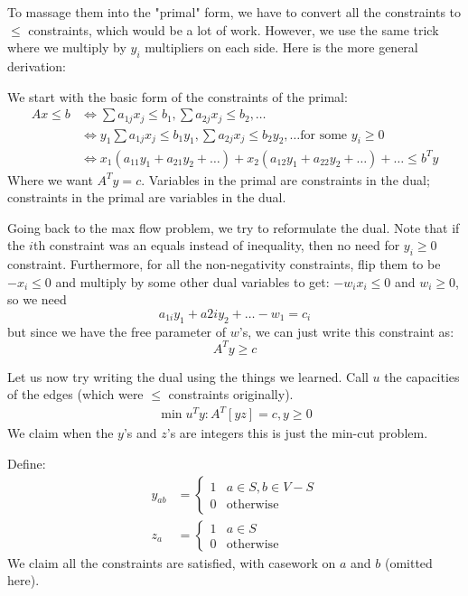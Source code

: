To massage them into the "primal" form, we have to convert all the constraints to $\leq$ constraints, which would be a lot of work.
However, we use the same trick where we multiply by $y_i$ multipliers on each side. Here is the more general derivation:

We start with the basic form of the constraints of the primal:
\begin{align*}
    Ax \leq b &\iff \sum a_{1j} x_j \leq b_1, \sum a_{2j} x_j \leq b_2, \dots \\
    &\iff y_1 \sum a_{1j} x_j \leq b_1 y_1, \sum a_{2j} x_j \leq b_2 y_2, \dots \text{for some $y_i \geq 0$}\\
    &\iff x_1(a_{11} y_1 + a_{21} y_2 + \dots) + x_2(a_{12}y_1 + a_{22}y_2 + \dots) + \dots \leq b^T y
\end{align*}
Where we want $A^T y = c$. Variables in the primal are constraints in the dual; constraints in the primal are variables in the dual.

Going back to the max flow problem, we try to reformulate the dual. Note that if the $i$th constraint was an equals instead of inequality, then no need for $y_i \geq 0$ constraint.
Furthermore, for all the non-negativity constraints, flip them to be $- x_i \leq 0$ and multiply by some other dual variables to get:
$- w_i x_i \leq 0$ and $w_i \geq 0$, so we need
\[ a_{1i} y_1 + a{2i} y_2 + \dots - w_1 = c_i \]
but since we have the free parameter of $w$'s, we can just write this constraint as:
\[ A^T y \geq c \]

Let us now try writing the dual using the things we learned. Call $u$ the capacities of the edges (which were $\leq$ constraints originally).
\begin{align*}
    \min u^T y : A^T [y z] = c, y \geq 0
\end{align*}
We claim when the $y$'s and $z$'s are integers this is just the min-cut problem.

Define:
\begin{align*}
    y_{ab} &= \begin{cases}
    1 & a \in S, b \in V - S \\
    0 & \text{otherwise}
    \end{cases} \\
    z_a &= \begin{cases}
        1 & a \in S \\
        0 & \text{otherwise}
    \end{cases}
\end{align*}
We claim all the constraints are satisfied, with casework on $a$ and $b$ (omitted here).
